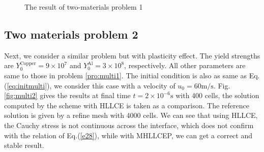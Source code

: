 \documentclass{article}
\numberwithin{equation}{section}
\numberwithin{table}{section}
\begin{document}
\begin{figure}
	  \caption{ The result of two-materials  problem 1}
	  \label{fig:multi1}
	\end{figure}

\subsection{Two materials problem 2}
Next, we consider a similar problem but with plasticity effect. The yield strengths are $Y_0^{\text{Copper}} = 9\times 10^7$ and $Y_0^{\text{Al}} = 3\times 10^8$, respectively. All other  parameters are same to those in problem \ref{pro:multi1}. The initial condition is also as  same as  Eq.(\ref{eq:initmulti}), we consider this case with a velocity of $u_0 = 60 \text{m}/\text{s}$.
Fig.\ref{fig:multi2} gives the results at final time $ t= 2 \times 10^{-6} \text{s}$ with 400 cells, the solution computed by the scheme with HLLCE is taken as a comparison. The reference solution is given by a refine mesh with 4000 cells. We can see that using HLLCE, the Cauchy stress is not continuous across the interface, which does not confirm with the relation of Eq.(\ref{e28}), while with MHLLCEP, we can get a correct and stable result.
\end{document}

